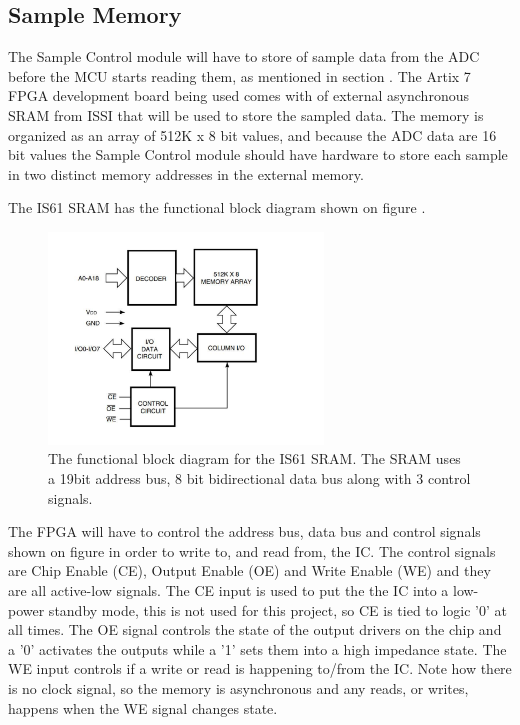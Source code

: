 \subsection{Sample Memory} \label{subsec:Sample_Memory} 
The Sample Control module will have to store  of sample data from the ADC before the MCU starts reading them, as mentioned in section . The Artix 7 FPGA development\cite{CMOD_A7_AT35T} board being used comes with  of external asynchronous SRAM from ISSI\cite{ISSISRAM} that will be used to store the sampled data. The memory is organized as an array of 512K x 8 bit values, and because the ADC data are 16 bit values the Sample Control module should have hardware to store each sample in two distinct memory addresses in the external memory.

The IS61 SRAM has the functional block diagram shown on figure .

\begin{figure}[H]
    \centering
    \includegraphics[clip, trim=0 0 0 0, width=0.65\textwidth]{Sections/7_SystemDesign/Figures/7_2_5_IS61_BLOCK_DIAGRAM.pdf}
    \caption{The functional block diagram for the IS61 SRAM\cite{ISSISRAM}. The SRAM uses a 19bit address bus, 8 bit bidirectional data bus along with 3 control signals.}
    \label{fig:7_2_5_IS61Block}
\end{figure}

The FPGA will have to control the address bus, data bus and control signals shown on figure  in order to write to, and read from, the IC. The control signals are Chip Enable (CE), Output Enable (OE) and Write Enable (WE) and they are all active-low signals. The CE input is used to put the the IC into a low-power standby mode, this is not used for this project, so CE is tied to logic '0' at all times. The OE signal controls the state of the output drivers on the chip and a '0' activates the outputs while a '1' sets them into a high impedance state. The WE input controls if a write or read is happening to/from the IC. Note how there is no clock signal, so the memory is asynchronous and any reads, or writes, happens when the WE signal changes state.

